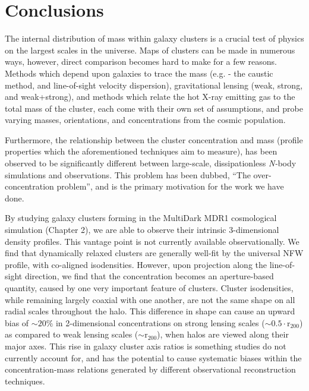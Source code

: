 \chapter{Conclusions}

The internal distribution of mass within galaxy clusters is a crucial test of
physics on the largest scales in the universe. Maps of clusters can be made in
numerous ways, however, direct comparison becomes hard to make for a few
reasons. Methods which depend upon galaxies to trace the mass 
(e.g. - the caustic method, and line-of-sight velocity dispersion),
gravitational lensing (weak, strong, and weak+strong), and methods which relate
the hot X-ray emitting gas to the total mass of the cluster, each come with
their own set of assumptions, and probe varying masses, orientations, and
concentrations from the cosmic population. 

Furthermore, the relationship between the cluster concentration and mass
(profile properties which the aforementioned techniques aim to measure),
has been observed to be significantly different between large-scale,
dissipationless {\em N-}body simulations and observations. This problem has been 
dubbed, ``The over-concentration problem'', and is the primary motivation for
the work we have done.

By studying galaxy clusters forming in the MultiDark MDR1 cosmological
simulation (Chapter 2), we are able to observe their intrinsic 3-dimensional
density profiles. This vantage point is not currently available
observationally. We find that dynamically relaxed clusters are generally 
well-fit by the universal NFW profile, with co-aligned isodensities. However,
upon projection along the line-of-sight direction, we find that the concentration
becomes an aperture-based quantity, caused by one very important feature of
clusters. Cluster isodensities, while remaining largely coaxial with one
another, are not the same shape on all radial scales throughout the halo. This
difference in shape can cause an upward bias of $\mathrm{\sim20\%}$ in
2-dimensional concentrations on strong lensing scales ($\mathrm{\sim 0.5\cdot
  r_{200}}$) as compared to weak lensing scales ($\mathrm{\sim r_{200}}$), when
halos are viewed along their major axes. This rise in galaxy cluster axis
ratios is something studies do not currently account for, and has the potential
to cause systematic biases within the concentration-mass relations generated by
different observational reconstruction techniques.

